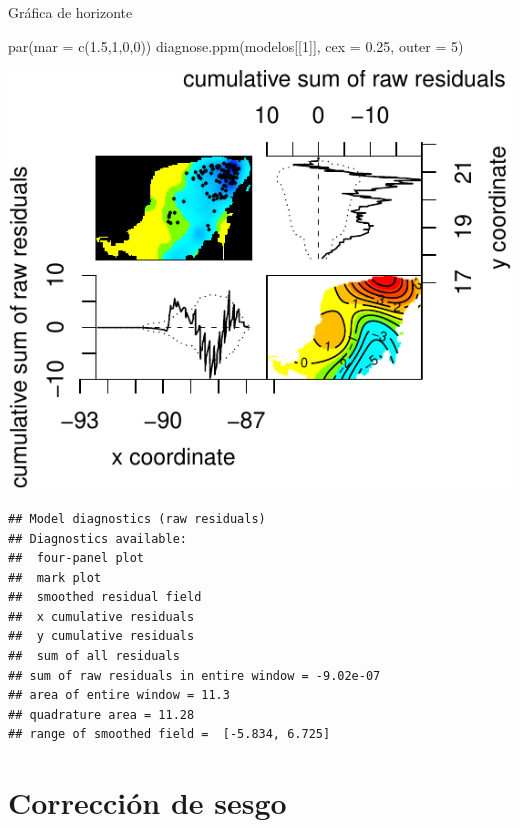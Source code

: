 \documentclass[
  11pt,
  ignorenonframetext,
]{beamer}
\newenvironment{Shaded}{}{}
\newcommand{\AttributeTok}[1]{\textcolor[rgb]{0.49,0.56,0.16}{#1}}
\newcommand{\DecValTok}[1]{\textcolor[rgb]{0.25,0.63,0.44}{#1}}
\newcommand{\FloatTok}[1]{\textcolor[rgb]{0.25,0.63,0.44}{#1}}
\newcommand{\FunctionTok}[1]{\textcolor[rgb]{0.02,0.16,0.49}{#1}}
\newcommand{\NormalTok}[1]{#1}
\begin{document}
\begin{frame}[fragile]{Gráfica de horizonte}
\protect\hypertarget{gruxe1fica-de-horizonte}{}
\begin{Shaded}
\begin{Highlighting}[]
\FunctionTok{par}\NormalTok{(}\AttributeTok{mar =} \FunctionTok{c}\NormalTok{(}\FloatTok{1.5}\NormalTok{,}\DecValTok{1}\NormalTok{,}\DecValTok{0}\NormalTok{,}\DecValTok{0}\NormalTok{))}
\FunctionTok{diagnose.ppm}\NormalTok{(modelos[[}\DecValTok{1}\NormalTok{]], }\AttributeTok{cex =} \FloatTok{0.25}\NormalTok{, }\AttributeTok{outer =} \DecValTok{5}\NormalTok{)}
\end{Highlighting}
\end{Shaded}

\begin{center}\includegraphics{Tutorial-spatstat-2_files/figure-beamer/unnamed-chunk-20-1} \end{center}

\begin{verbatim}
## Model diagnostics (raw residuals)
## Diagnostics available:
##  four-panel plot
##  mark plot 
##  smoothed residual field
##  x cumulative residuals
##  y cumulative residuals
##  sum of all residuals
## sum of raw residuals in entire window = -9.02e-07
## area of entire window = 11.3
## quadrature area = 11.28
## range of smoothed field =  [-5.834, 6.725]
\end{verbatim}
\end{frame}

\hypertarget{correcciuxf3n-de-sesgo}{%
\section{Corrección de sesgo}\label{correcciuxf3n-de-sesgo}}
\end{document}
